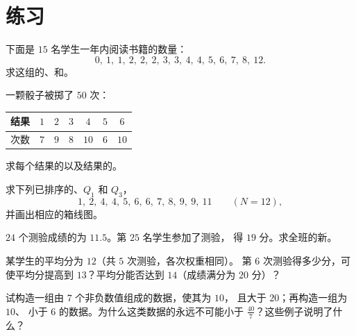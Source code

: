 \section{练习}

\begin{exercise}[$\star$]\label{exo:g10:stats:1}
下面是 $15$ 名学生一年内阅读书籍的数量：
\[
0,\ 1,\ 1,\ 2,\ 2,\ 2,\ 3,\ 3,\ 4,\ 4,\ 5,\ 6,\ 7,\ 8,\ 12 .
\]
求这组的、和。
\end{exercise}

\begin{exercise}[$\star$]\label{exo:g10:stats:2}
一颗骰子被掷了 $50$ 次：
\begin{center}
\renewcommand{\arraystretch}{1.2}
\begin{tabular}{c|cccccc}
结果 & $1$ & $2$ & $3$ & $4$ & $5$ & $6$ \\
\hline
次数 & $7$ & $9$ & $8$ & $10$ & $6$ & $10$ \\
\end{tabular}
\end{center}
求每个结果的以及结果的。
\end{exercise}

\begin{exercise}[$\star$]\label{exo:g10:stats:3}
求下列已排序的、$Q_1$ 和 $Q_3$，
\[
1,\ 2,\ 4,\ 4,\ 5,\ 6,\ 6,\ 7,\ 8,\ 9,\ 9,\ 11 \qquad (N = 12),
\]
并画出相应的箱线图。
\end{exercise}

\begin{exercise}[$\star$]\label{exo:g10:stats:4}
$24$ 个测验成绩的为 $11.5$。第 $25$ 名学生参加了测验，
得 $19$ 分。求全班的新。
\end{exercise}

\begin{exercise}[$\star\star$]\label{exo:g10:stats:5}
某学生的平均分为 $12$（共 $5$ 次测验，各次权重相同）。
第 $6$ 次测验得多少分，可使平均分提高到 $13$？平均分能否达到
$14$（成绩满分为 $20$ 分）？
\end{exercise}

\begin{exercise}[$\star\star$]\label{exo:g10:stats:6}
试构造一组由 $7$ 个非负数值组成的数据，使其为 $10$，
且大于 $20$；再构造一组为 $10$、
小于 $6$ 的数据。为什么这类数据的永远不可能小于
$\frac{40}{7}$？这些例子说明了什么？
\end{exercise}

